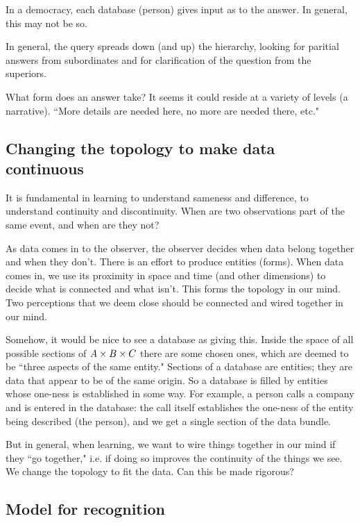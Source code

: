 \documentclass{amsart}
\begin{document}
In a democracy, each database (person) gives input as to the answer.  In general, this may not be so.

In general, the query spreads down (and up) the hierarchy, looking for paritial answers from subordinates and for clarification of the question from the superiors.

What form does an answer take?  It seems it could reside at a variety of levels (a narrative).  ``More details are needed here, no more are needed there, etc."


\subsection{Changing the topology to make data continuous}

It is fundamental in learning to understand sameness and difference, to understand continuity and discontinuity.  When are two observations part of the same event, and when are they not?  

As data comes in to the observer, the observer decides when data belong together and when they don't.  There is an effort to produce entities (forms).  When data comes in, we use its proximity in space and time (and other dimensions) to decide what is connected and what isn't.  This forms the topology in our mind.  Two perceptions that we deem close should be connected and wired together in our mind.

Somehow, it would be nice to see a database as giving this.  Inside the space of all possible sections of $A\times B\times C$ there are some chosen ones, which are deemed to be ``three aspects of the same entity."  Sections of a database are entities; they are data that appear to be of the same origin.  So a database is filled by entities whose one-ness is established in some way.  For example, a person calls a company and is entered in the database: the call itself establishes the one-ness of the entity being described (the person), and we get a single section of the data bundle.

But in general, when learning, we want to wire things together in our mind if they ``go together," i.e. if doing so improves the continuity of the things we see.  We change the topology to fit the data.  Can this be made rigorous?

\subsection{Model for recognition}
\end{document}

